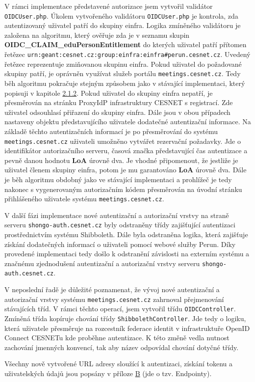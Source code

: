 \documentclass[
  printed, %
  twoside, %
  table,   %
  nolof,     %
  nolot,     %
]{fithesis3}
\begin{document}
\par

V rámci implementace představené autorizace jsem vytvořil validátor \texttt{OIDCUser.php}. Úkolem vytvořeného validátoru \texttt{OIDCUser.php} je kontrola, zda autentizovaný uživatel patří do skupiny einfra. Logika zmíněného validátoru je založena na algoritmu, který ověřuje zda je v seznamu skupin \textbf{OIDC\_CLAIM\_eduPersonEntitlement} do kterých uživatel patří přítomen řetězec \texttt{urn:geant:cesnet.cz:group:einfra:einfra\#perun.cesnet.cz}. Uvedený řetězec reprezentuje zmiňovanou skupinu einfra. Pokud uživatel do požadované skupiny patří, je oprávněn využívat služeb portálu \texttt{meetings.cesnet.cz}. Tedy běh algoritmu pokračuje stejným způsobem jako v stávající implementaci, který popisuji v kapitole \hyperref[meetings-old]{2.1.2}. Pokud uživatel do skupiny einfra nepatří, je přesměrován na stránku ProxyIdP infrastruktury CESNET s registrací. Zde uživatel odsouhlasí přiřazení do skupiny einfra. Dále jsou v obou případech nastaveny objektu představujícího uživatele dodatečné autentizační informace. Na základě těchto autentizačních informací je po přesměrování do systému \texttt{meetings.cesnet.cz} uživateli umožněno vytvářet rezervační požadavky. Jde o identifikátor autorizačního serveru, časová značka představující čas autentizace a pevně danou hodnotu \textbf{LoA} úrovně dva. Je vhodné připomenout, že jestliže je uživatel členem skupiny einfra, potom je mu garantováno \textbf{LoA} úrovně dva. Dále je běh algoritmu obdobný jako ve stávající implementaci a prohlížeč je tedy nakonec s vygenerovaným autorizačním kódem přesměrován na úvodní stránku přihlášeného uživatele systému \texttt{meetings.cesnet.cz}.

\par

V další fázi implementace nové autentizační a autorizační vrstvy na straně serveru \texttt{shongo-auth.cesnet.cz} byly odstraněny třídy zajišťující autentizaci prostřednictvím systému Shibboleth. Dále byla odstraněna logika, která zajišťuje získání dodatečných informací o uživateli pomocí webové služby Perun. Díky provedené implementaci tedy došlo k odstranění závislosti na externím systému a značnému zjednodušení autentizační a autorizační vrstvy serveru \texttt{shongo-auth.cesnet.cz}.

\par

V neposlední řadě je důležité poznamenat, že vývoj nové autentizační a autorizační vrstvy systému \texttt{meetings.cesnet.cz} zahrnoval přejmenování stávajících tříd. V rámci těchto operací, jsem vytvořil třídu \texttt{OIDCController}. Zmíněná třída kopíruje chování třídy \texttt{ShibbolethController}. Jde tedy o logiku, která uživatele přesměruje na rozcestník federace identit v infrastruktuře OpenID Connect CESNETu kde proběhne autentizace. K této změně vedla nutnost zachování jmenných konvencí, tak aby název odpovídal chování dotyčné třídy. 
\par
Všechny nově vytvořené URL adresy sloužící k autentizaci, získání tokenu a uživatelských údajů jsou popsány v příloze \hyperref[oidcEndpoints]{B} (jde o tzv. Endpointy).
\par 
\end{document}
